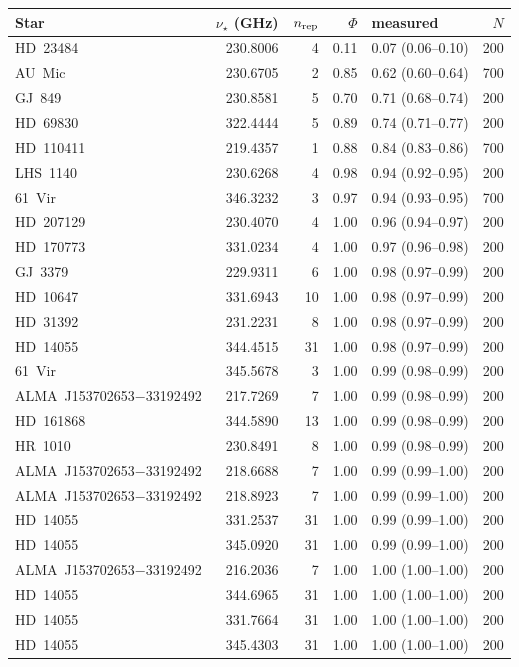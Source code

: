 \begin{tabular}{@{}l@{~~}r@{~~}r@{~~}r@{~~}l@{~~}r@{}}
\hline
Star & $\nu_\star$ (GHz) & $n_{\rm rep}$ & $\Phi$ & measured & $N$ \\
\hline
HD~23484 & 230.8006 & 4 & 0.11 & 0.07 (0.06--0.10) & 200 \\
AU~Mic & 230.6705 & 2 & 0.85 & 0.62 (0.60--0.64) & 700 \\
GJ~849 & 230.8581 & 5 & 0.70 & 0.71 (0.68--0.74) & 200 \\
HD~69830 & 322.4444 & 5 & 0.89 & 0.74 (0.71--0.77) & 200 \\
HD~110411 & 219.4357 & 1 & 0.88 & 0.84 (0.83--0.86) & 700 \\
LHS~1140 & 230.6268 & 4 & 0.98 & 0.94 (0.92--0.95) & 200 \\
61~Vir & 346.3232 & 3 & 0.97 & 0.94 (0.93--0.95) & 700 \\
HD~207129 & 230.4070 & 4 & 1.00 & 0.96 (0.94--0.97) & 200 \\
HD~170773 & 331.0234 & 4 & 1.00 & 0.97 (0.96--0.98) & 200 \\
GJ~3379 & 229.9311 & 6 & 1.00 & 0.98 (0.97--0.99) & 200 \\
HD~10647 & 331.6943 & 10 & 1.00 & 0.98 (0.97--0.99) & 200 \\
HD~31392 & 231.2231 & 8 & 1.00 & 0.98 (0.97--0.99) & 200 \\
HD~14055 & 344.4515 & 31 & 1.00 & 0.98 (0.97--0.99) & 200 \\
61~Vir & 345.5678 & 3 & 1.00 & 0.99 (0.98--0.99) & 200 \\
ALMA~J153702653$-$33192492 & 217.7269 & 7 & 1.00 & 0.99 (0.98--0.99) & 200 \\
HD~161868 & 344.5890 & 13 & 1.00 & 0.99 (0.98--0.99) & 200 \\
HR~1010 & 230.8491 & 8 & 1.00 & 0.99 (0.98--0.99) & 200 \\
ALMA~J153702653$-$33192492 & 218.6688 & 7 & 1.00 & 0.99 (0.99--1.00) & 200 \\
ALMA~J153702653$-$33192492 & 218.8923 & 7 & 1.00 & 0.99 (0.99--1.00) & 200 \\
HD~14055 & 331.2537 & 31 & 1.00 & 0.99 (0.99--1.00) & 200 \\
HD~14055 & 345.0920 & 31 & 1.00 & 0.99 (0.99--1.00) & 200 \\
ALMA~J153702653$-$33192492 & 216.2036 & 7 & 1.00 & 1.00 (1.00--1.00) & 200 \\
HD~14055 & 344.6965 & 31 & 1.00 & 1.00 (1.00--1.00) & 200 \\
HD~14055 & 331.7664 & 31 & 1.00 & 1.00 (1.00--1.00) & 200 \\
HD~14055 & 345.4303 & 31 & 1.00 & 1.00 (1.00--1.00) & 200 \\
\hline
\end{tabular}
